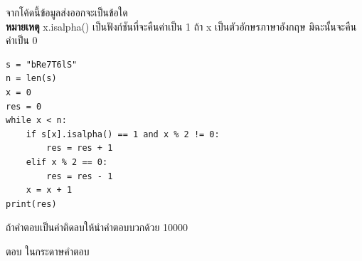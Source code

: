 \question จากโค้ดนี้ข้อมูลส่งออกจะเป็นข้อใด \\ 
\textbf{หมายเหตุ} x.isalpha() เป็นฟังก์ชันที่จะคืนค่าเป็น 1 ถ้า x เป็นตัวอักษรภาษาอังกฤษ มิฉะนั้นจะคืนค่าเป็น 0
\begin{verbatim}
s = "bRe7T6lS"
n = len(s)
x = 0
res = 0
while x < n:
    if s[x].isalpha() == 1 and x % 2 != 0:
        res = res + 1
    elif x % 2 == 0:
        res = res - 1
    x = x + 1
print(res)
\end{verbatim}
ถ้าคำตอบเป็นค่าติดลบให้นำคำตอบบวกด้วย 10000
\par\medskip
ตอบ ในกระดาษคำตอบ
